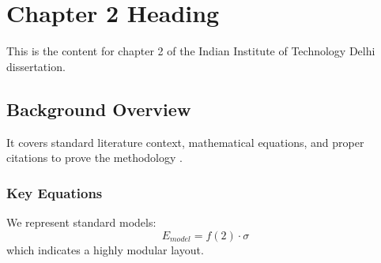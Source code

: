 \chapter{Chapter 2 Heading}
\label{ch:chapter2}
This is the content for chapter 2 of the Indian Institute of Technology Delhi dissertation.

\section{Background Overview}
It covers standard literature context, mathematical equations, and proper citations to prove the methodology \cite{texbook}.

\subsection{Key Equations}
We represent standard models:
\begin{equation}
    E_{model} = f(2) \cdot \sigma
\end{equation}
which indicates a highly modular layout.
